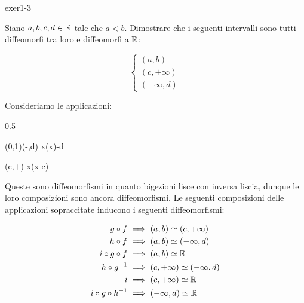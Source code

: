 
{exer1-3}
{
Siano $ a,b,c,d \in \mathbb{R} $ tale che $ a<b $. Dimostrare che i seguenti intervalli sono tutti diffeomorfi tra loro e diffeomorfi a $ \mathbb{R} $:

\begin{equation}
	\begin{cases}
		(a,b) \\
		(c,+\infty) \\
		(-\infty,d)
	\end{cases}
\end{equation}
}
{
Consideriamo le applicazioni:

	{0.5}{%
				{(0,1)}{(-\infty,d)}
				{x}{\ln(x)-d}
	
				{(c,+\infty)}{\R}
				{x}{\ln(x-c)}
			}

Queste sono diffeomorfismi in quanto bigezioni lisce con inversa liscia, dunque le loro composizioni sono ancora diffeomorfismi. Le seguenti composizioni delle applicazioni sopraccitate inducono i seguenti diffeomorfismi:

\begin{align}
	\begin{split}
		g \circ f &\implies (a,b) \simeq (c,+\infty) \\
		h \circ f &\implies (a,b) \simeq (-\infty,d) \\
		i \circ g \circ f &\implies (a,b) \simeq \mathbb{R} \\
		h \circ g^{-1} &\implies (c,+\infty) \simeq (-\infty,d) \\
		i &\implies (c,+\infty) \simeq \mathbb{R} \\
		i \circ g \circ h^{-1} &\implies (-\infty,d) \simeq \mathbb{R}
	\end{split}
\end{align}
}


